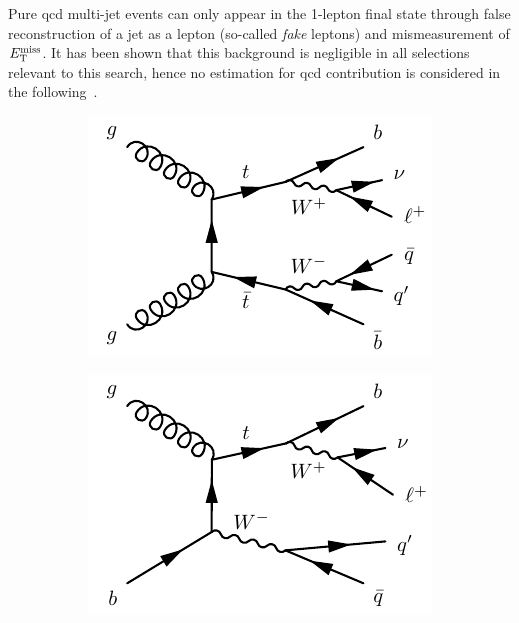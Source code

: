 Pure \gls{qcd} multi-jet events can only appear in the 1-lepton final state through false reconstruction of a jet as a lepton (so-called \textit{fake} leptons) and mismeasurement of $E_{\textrm{T}}^{\textrm{miss}}$. It has been shown that this background is negligible in all selections relevant to this search, hence no estimation for \gls{qcd} contribution is considered in the following~\cite{SUSY-2019-08}.

\begin{figure}
	\centering
	\begin{subfigure}[b]{0.3\linewidth}
		\centering\includegraphics[width=\textwidth]{ttbar}
		\caption{\label{fig:ttbar}}
	\end{subfigure}\quad
		\begin{subfigure}[b]{0.3\linewidth}
		\centering\includegraphics[width=\textwidth]{singletop}
		\caption{\label{fig:singletop}}

\end{subfigure}
\end{figure}
